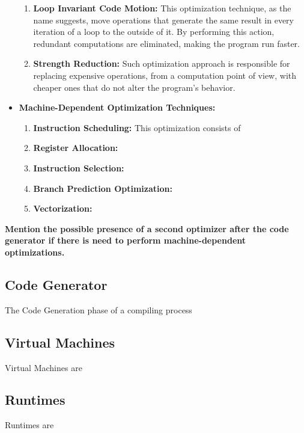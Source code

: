 \begin{itemize}
\begin{enumerate}
            \item \textbf{Loop Invariant Code Motion:} This optimization technique, as the name suggests, move operations that generate the same result in every iteration of a loop to the outside of it. By performing this action, redundant computations are eliminated, making the program run faster.
            
            \item \textbf{Strength Reduction:} Such optimization approach is responsible for replacing expensive operations, from a computation point of view, with cheaper ones that do not alter the program's behavior.
        \end{enumerate}
    \item \textbf{Machine-Dependent Optimization Techniques:}
        \begin{enumerate}
            \item \textbf{Instruction Scheduling:} This optimization consists of 
            
            \item \textbf{Register Allocation:}
            
            \item \textbf{Instruction Selection:}
            
            \item \textbf{Branch Prediction Optimization:}
            
            \item \textbf{Vectorization:}
        
        \end{enumerate}
\end{itemize}

\textbf{Mention the possible presence of a second optimizer after the code generator if there is need to perform machine-dependent optimizations.}

\subsection{Code Generator}
The Code Generation phase of a compiling process


\subsection{Virtual Machines}
Virtual Machines are 

\subsection{Runtimes}
Runtimes are


